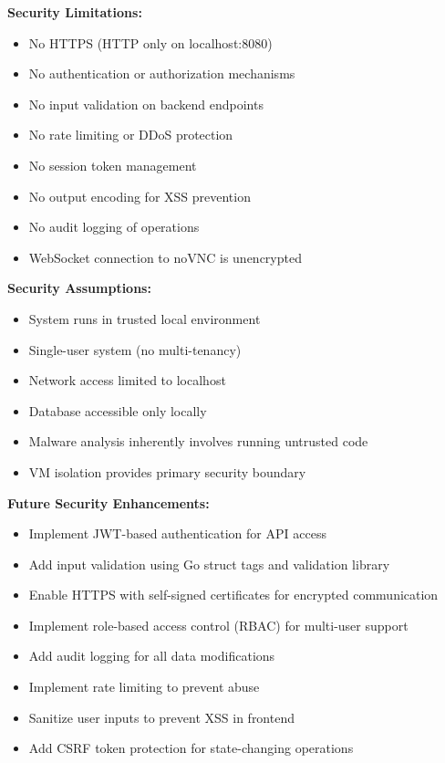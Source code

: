 \textbf{Security Limitations:}
\begin{itemize}
    \item No HTTPS (HTTP only on localhost:8080)
    \item No authentication or authorization mechanisms
    \item No input validation on backend endpoints
    \item No rate limiting or DDoS protection
    \item No session token management
    \item No output encoding for XSS prevention
    \item No audit logging of operations
    \item WebSocket connection to noVNC is unencrypted
\end{itemize}

\textbf{Security Assumptions:}
\begin{itemize}
    \item System runs in trusted local environment
    \item Single-user system (no multi-tenancy)
    \item Network access limited to localhost
    \item Database accessible only locally
    \item Malware analysis inherently involves running untrusted code
    \item VM isolation provides primary security boundary
\end{itemize}

\textbf{Future Security Enhancements:}
\begin{itemize}
    \item Implement JWT-based authentication for API access
    \item Add input validation using Go struct tags and validation library
    \item Enable HTTPS with self-signed certificates for encrypted communication
    \item Implement role-based access control (RBAC) for multi-user support
    \item Add audit logging for all data modifications
    \item Implement rate limiting to prevent abuse
    \item Sanitize user inputs to prevent XSS in frontend
    \item Add CSRF token protection for state-changing operations
\end{itemize}

